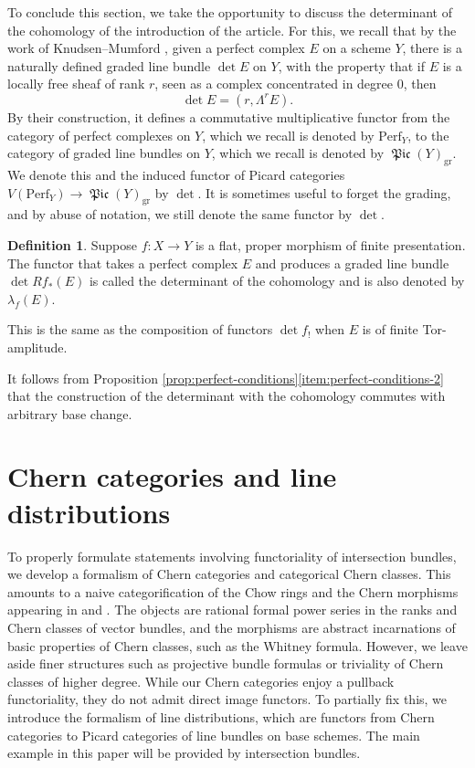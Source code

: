 \documentclass[11pt]{article}
\theoremstyle{plain}
\theoremstyle{definition}
\newtheorem{definition}[theorem]{Definition}
\DeclareMathOperator{\Picfr}{\mathfrak{Pic}}
\begin{document}
To conclude this section, we take the opportunity to discuss the determinant of the cohomology of the introduction of the article. For this, we recall that by the work of Knudsen--Mumford \cite{KnudsenMumford}, given a perfect complex $E$ on a scheme $Y$, there is a naturally defined graded line bundle $\det E$ on $Y$, with the property that if $E$ is a locally free sheaf of rank $r$, seen as a complex concentrated in degree 0, then
\begin{displaymath}
\det E = (r, \Lambda^{r} E).
\end{displaymath}
By their construction, it defines a commutative multiplicative functor from the category of perfect complexes on $Y$, which we recall is denoted by $\mathrm{Perf}_{Y}$, to the category of graded line bundles on $Y$, which we recall is denoted by $\Picfr(Y)_{\mathrm{gr}}$. We denote this and the induced functor of Picard categories $V(\mathrm{Perf}_{Y}) \to \Picfr(Y)_{\mathrm{gr}}$ by $\det$. It is sometimes useful to forget the grading, and by abuse of notation, we still denote the same functor by $\det$.

\begin{definition}\label{def:detcoh}
Suppose $f: X \to Y$ is a flat, proper morphism of finite presentation. The functor that takes a perfect complex $E$ and produces a graded line bundle $\det Rf_{\ast} (E)$ is called the determinant of the cohomology and is also denoted by $\lambda_{f}(E)$.

This is the same as the composition of functors $\det f_!$ when $E$ is of finite Tor-amplitude.
\end{definition}

It follows from Proposition \ref{prop:perfect-conditions}\eqref{item:perfect-conditions-2} that the construction of the determinant with the cohomology commutes with arbitrary base change.

\section{Chern categories and line distributions}\label{subsection:Chern-categories}

To properly formulate statements involving functoriality of intersection bundles, we develop a formalism of Chern categories and categorical Chern classes. This amounts to a naive categorification of the Chow rings and the Chern morphisms appearing in \cite{SGA6} and \cite{FultonLang}. The objects are rational formal power series in the ranks and Chern classes of vector bundles, and the morphisms are abstract incarnations of basic properties of Chern classes, such as the Whitney formula. However, we leave aside finer structures such as projective bundle formulas or triviality of Chern classes of higher degree. While our Chern categories enjoy a pullback functoriality, they do not admit direct image functors. To partially fix this, we introduce the formalism of line distributions, which are functors from Chern categories to Picard categories of line bundles on base schemes. The main example in this paper will be provided by intersection bundles.
\end{document}
